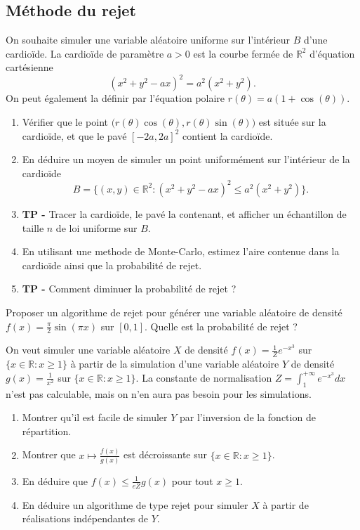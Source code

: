 \documentclass{exercices}
\begin{document}
\subsection*{Méthode du rejet}

\begin{exercice}
On souhaite simuler une variable aléatoire uniforme sur l'intérieur $B$ d'une cardioïde. La cardioïde de paramètre $a>0$ est la courbe fermée de $\mathbb{R}^2$ d'équation cartésienne
$$(x^2+y^2-ax)^2=a^2(x^2+y^2).$$
On peut également la définir par l'équation polaire
$r(\theta)=a(1+\cos(\theta)).$
\begin{enumerate}
\item
Vérifier que le point $\Big(r(\theta)\cos(\theta),r(\theta)\sin(\theta)\Big)$ est située sur la cardioïde, et que le pavé $[-2a,2a]^2$ contient la cardioïde.
\item
En déduire un moyen de simuler un point uniformément sur l'intérieur de la cardioïde
$$B=\{(x,y)\in \mathbb{R}^2:(x^2+y^2-ax)^2\leq a^2(x^2+y^2)\}.$$
\item
\textbf{TP -} Tracer la cardioïde, le pavé la contenant, et afficher un échantillon de taille $n$ de loi uniforme sur $B$.
\item En utilisant une methode de Monte-Carlo, estimez l'aire contenue dans la cardioïde ainsi que la probabilité de rejet.
\item \textbf{TP -}
Comment diminuer la probabilité de rejet ?
\end{enumerate}
\end{exercice}

\begin{exercice}
Proposer un algorithme de rejet pour générer une variable aléatoire de densité $f(x)=\frac{\pi}{2}\sin(\pi x)$ sur $[0,1]$.  Quelle est la probabilité de rejet ?
\end{exercice}

\begin{exercice}
On veut simuler une variable aléatoire $X$ de densité $f(x)=\frac{1}{Z}e^{-x^3}$ sur $\{x\in \mathbb{R}:x\geq 1\}$ à partir de la simulation d'une variable aléatoire $Y$ de densité $g(x)=\frac{1}{x^2}$ sur $\{x\in \mathbb{R}:x\geq 1\}$. La constante de normalisation $Z=\int_1^{+\infty}e^{-x^3}dx$ n'est pas calculable, mais on n'en aura pas besoin pour les simulations.
\begin{enumerate}
\item Montrer qu'il est facile de simuler $Y$ par l'inversion de la fonction de répartition.
\item Montrer que $x\mapsto \frac{f(x)}{g(x)}$ est décroissante sur $\{x\in \mathbb{R}:x\geq 1\}$.
\item En déduire que $f(x)\leq \frac{1}{eZ} g(x)$ pour tout $x\geq 1$.
\item En déduire un algorithme de type rejet pour simuler $X$ à partir de réalisations indépendantes de $Y$.
\end{enumerate}
\end{exercice}
\end{document}
